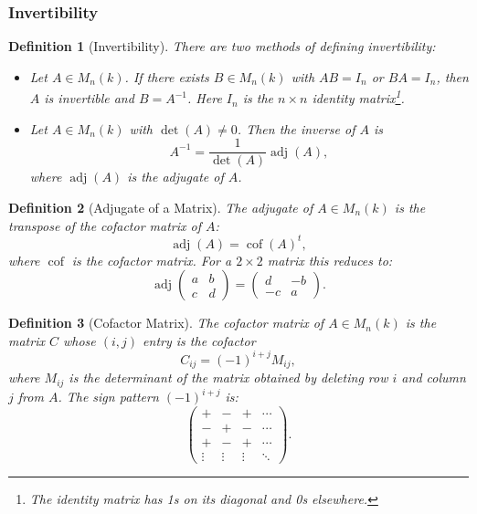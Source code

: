 \documentclass{article}
\newtheorem{definition}{Definition}
\begin{document}
\subsubsection{Invertibility}
\begin{definition}[Invertibility]
    There are two methods of defining invertibility:
    \begin{itemize}
        \item Let $A \in M_n(k)$. If there exists $B \in M_n(k)$ with $AB = I_n$ or $BA = I_n$, then $A$ is invertible and $B = A^{-1}$. Here $I_n$ is the $n\times n$ identity matrix\footnote{The identity matrix has 1s on its diagonal and 0s elsewhere.}.
        \item Let $A \in M_n(k)$ with $\det(A) \neq 0$. Then the inverse of $A$ is
        \[A^{-1} = \frac{1}{\det(A)}\operatorname{adj}(A),\]
        where $\operatorname{adj}(A)$ is the adjugate of $A$.
    \end{itemize}
\end{definition}
\begin{definition}[Adjugate of a Matrix]
    The adjugate of $A \in M_n(k)$ is the transpose of the cofactor matrix of $A$:
    \[\operatorname{adj}(A) = \operatorname{cof}(A)^t,\]
    where $\operatorname{cof}$ is the cofactor matrix. For a $2\times 2$ matrix this reduces to:
    \[\operatorname{adj}\begin{pmatrix}a&b\\c&d\end{pmatrix} = \begin{pmatrix}d&-b\\-c&a\end{pmatrix}.\]
\end{definition}
\begin{definition}[Cofactor Matrix]
    The cofactor matrix of $A \in M_n(k)$ is the matrix $C$ whose $(i,j)$ entry is the cofactor
    \[C_{ij} = (-1)^{i+j} M_{ij},\]
    where $M_{ij}$ is the determinant of the matrix obtained by deleting row $i$ and column $j$ from $A$. The sign pattern $(-1)^{i+j}$ is:
    \[\begin{pmatrix}+&-&+&\cdots\\-&+&-&\cdots\\+&-&+&\cdots\\\vdots&\vdots&\vdots&\ddots\end{pmatrix}.\]
\end{definition}
\end{document}

